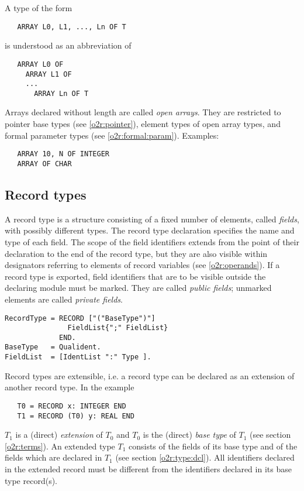 A type of the form
\begin{verbatim}
   ARRAY L0, L1, ..., Ln OF T
\end{verbatim}
is understood as an abbreviation of
\begin{verbatim}
   ARRAY L0 OF
     ARRAY L1 OF
     ...
       ARRAY Ln OF T
\end{verbatim}
Arrays declared without length are called {\em open arrays}. They
are restricted to pointer base types (see \ref{o2r:pointer}),
element types of open array types, and formal parameter types
(see \ref{o2r:formal:param}).
Examples:
\begin{verbatim}
   ARRAY 10, N OF INTEGER
   ARRAY OF CHAR
\end{verbatim}

\subsection{Record types}\label{o2r:record}

A record type is a structure consisting of a fixed number of elements,
called {\em fields}, with possibly different types. The record type
declaration specifies the name and type of each field. The scope of
the field identifiers extends from the point of their declaration
to the end of the record type, but they are also visible within designators
referring to elements of record variables (see \ref{o2r:operands}).
If a record type is exported, field identifiers that are to be visible
outside the declaring module must be marked. They are called {\em public
fields}; unmarked elements are called {\em private fields}.
{\BNFsize
\begin{verbatim}
RecordType = RECORD ["("BaseType")"]
               FieldList{";" FieldList}
             END.
BaseType   = Qualident.
FieldList  = [IdentList ":" Type ].
\end{verbatim}}
Record types are extensible, i.e. a record type can be declared as
an extension of another record type. In the example
\begin{verbatim}
   T0 = RECORD x: INTEGER END
   T1 = RECORD (T0) y: REAL END
\end{verbatim}
$T_1$ is a (direct) {\em extension} of $T_0$ and $T_0$ is the (direct)
{\em base type} of $T_1$ (see section \ref{o2r:terms}). An extended
type $T_1$ consists of the fields of its base type and of the fields
which are declared in $T_1$ (see section \ref{o2r:type:dcl}).
All identifiers declared in the extended record must be different
from the identifiers declared in its base type record(s).

